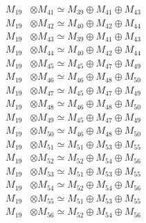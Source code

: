 \begin{align*}
M_{19} &\otimes M_{41} \simeq M_{39} \oplus M_{41} \oplus M_{43} \\
M_{19} &\otimes M_{42} \simeq M_{40} \oplus M_{42} \oplus M_{44} \\
M_{19} &\otimes M_{43} \simeq M_{39} \oplus M_{41} \oplus M_{43} \\
M_{19} &\otimes M_{44} \simeq M_{40} \oplus M_{42} \oplus M_{44} \\
M_{19} &\otimes M_{45} \simeq M_{45} \oplus M_{47} \oplus M_{49} \\
M_{19} &\otimes M_{46} \simeq M_{46} \oplus M_{48} \oplus M_{50} \\
M_{19} &\otimes M_{47} \simeq M_{45} \oplus M_{47} \oplus M_{49} \\
M_{19} &\otimes M_{48} \simeq M_{46} \oplus M_{48} \oplus M_{50} \\
M_{19} &\otimes M_{49} \simeq M_{45} \oplus M_{47} \oplus M_{49} \\
M_{19} &\otimes M_{50} \simeq M_{46} \oplus M_{48} \oplus M_{50} \\
M_{19} &\otimes M_{51} \simeq M_{51} \oplus M_{53} \oplus M_{55} \\
M_{19} &\otimes M_{52} \simeq M_{52} \oplus M_{54} \oplus M_{56} \\
M_{19} &\otimes M_{53} \simeq M_{51} \oplus M_{53} \oplus M_{55} \\
M_{19} &\otimes M_{54} \simeq M_{52} \oplus M_{54} \oplus M_{56} \\
M_{19} &\otimes M_{55} \simeq M_{51} \oplus M_{53} \oplus M_{55} \\
M_{19} &\otimes M_{56} \simeq M_{52} \oplus M_{54} \oplus M_{56} \\
\end{align*}

